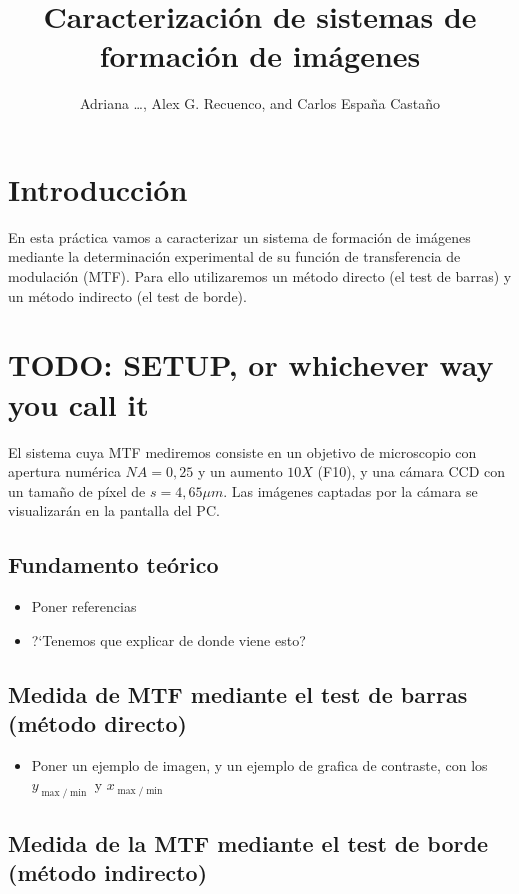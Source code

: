 \documentclass{./packages/optica-article}
\begin{document}
\title{Caracterización de sistemas de formación de imágenes}

\author{Adriana \ldots, Alex G. Recuenco, and Carlos España Castaño}

\address{Universidad Complutense de Madrid, Madrid, DC 28040, España}

\section{Introducción}
En esta práctica vamos a caracterizar un sistema de formación de imágenes mediante la determinación experimental de su función de transferencia de modulación (MTF). Para ello utilizaremos un método directo (el test de barras) y un método indirecto (el test de borde).


\section{TODO: SETUP, or whichever way you call it}

El sistema cuya MTF mediremos consiste en un objetivo de microscopio con apertura numérica $NA = 0,25$ y un aumento $10X$ (F10), y una cámara CCD con un tamaño de píxel de $s=4,65 \mu m$. Las imágenes captadas por la cámara se visualizarán en la pantalla del PC.

\subsection{Fundamento teórico}

\begin{itemize}
	\item Poner referencias
	\item ?`Tenemos que explicar de donde viene esto?
\end{itemize}


\subsection{Medida de MTF mediante el test de barras (método directo)}

\begin{itemize}
	\item Poner un ejemplo de imagen, y un ejemplo de grafica de contraste, con los $y_{\max/\min}$ y $x_{\max/\min}$

\end{itemize}

\subsection{Medida de la MTF mediante el test de borde (método indirecto)}
\end{document}

